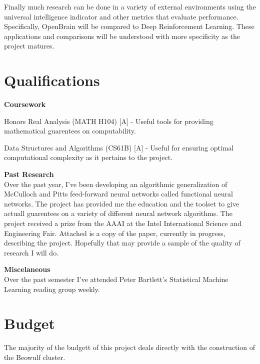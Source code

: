 \documentclass[letter]{article}
\newenvironment{menumerate}{%
  \edef\backupindent{\the\parindent}%
  \enumerate%
  \setlength{\parindent}{\backupindent}%
}{\endenumerate}
\begin{document}
Finally much research can be done in a variety of external environments using the universal intelligence indicator and other metrics that evaluate performance.
Specifically, OpenBrain will be compared to Deep Reinforcement Learning. These applications and comparisons will be
understood with more specificity as the project matures.

\section{Qualifications}
\textbf{Coursework}
\begin{menumerate}
\item Honors Real Analysis (MATH H104) [A] - Useful tools for providing mathematical guarentees on computability.
\item Data Structures and Algorithms (CS61B) [A] - Useful for ensuring optimal computational complexity as it pertains to the project.
\end{menumerate}


\textbf{Past Research} \\
Over the past year, I've been developing an algorithmic generalization of McCulloch and Pitts feed-forward neural networks
called functional neural networks. The project has provided me the education and the toolset to give actuall guarentees on
a variety of different neural network algorithms. The project received a prize from the AAAI at the Intel International Science and Engineering Fair.
Attached is a copy of the paper, currently in progress, describing the project. Hopefully that may provide a sample of the quality
of research I will do.

\textbf{Miscelaneous} \\
Over the past semester I've attended Peter Bartlett's Statistical Machine Learning reading group weekly.


\section{Budget}
The majority of the budgett of this project deals directly with the construction of the Beowulf cluster.
\end{document}
